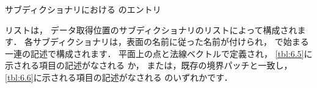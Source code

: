 \begin{table}[ht]
 
 \caption{サブディクショナリにおける
 のエントリ}
 \label{tbl:6.5}
\end{table}


\begin{table}[ht]
 
 \caption{サブディクショナリにおける
%
%
 用のエントリ}
 \label{tbl:6.6}
\end{table}


リストは，
データ取得位置のサブディクショナリのリストによって構成されます．
各サブディクショナリは，表面の名前に従った名前が付けられ，
で始まる一連の記述で構成されます．
平面上の点と法線ベクトルで定義され，
\autoref{tbl:6.5}に示される項目の記述がなされる
か，
または，既存の境界パッチと一致し，
\autoref{tbl:6.6}に示される項目の記述がなされる
のいずれかです．



